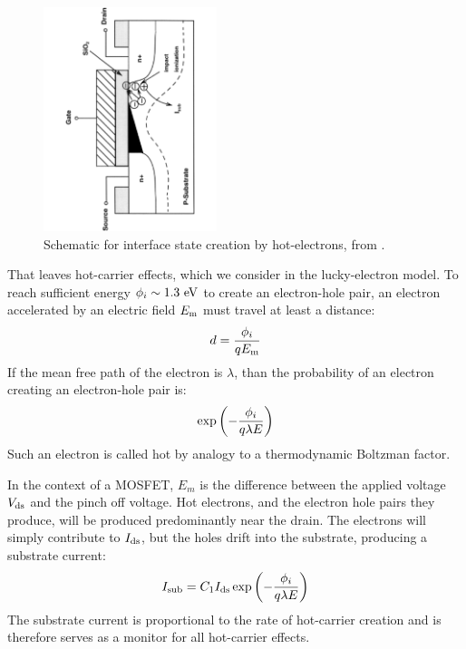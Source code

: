 \documentclass[12pt]{article}
\begin{document}
\begin{figure}[htbp]
\begin{center}
\includegraphics[width=0.45\textwidth,angle=270]{figs/hot-carrier.pdf} 
\caption{Schematic for interface state creation by hot-electrons, from \cite{hot-carrier-effects}.}
\label{fig:lifetime}
\end{center}
\end{figure}

That leaves hot-carrier effects, which we consider in the lucky-electron model.   To reach sufficient energy $\phi_i \sim 1.3~\rm eV$ to create an electron-hole pair, an electron accelerated by an electric field $E_{\rm m}$ must travel at least a distance:
\begin{displaymath}
d = \frac{\phi_i}{q E_{\rm m}}
\end{displaymath}
If the mean free path of the electron is $\lambda$, than the probability of an electron creating an electron-hole pair is:
\begin{displaymath}
\exp\left(-\frac{\phi_i}{q \lambda E_{\rm}}\right)
\end{displaymath}
Such an electron is called hot by analogy to a thermodynamic Boltzman factor.

In the context of a MOSFET, $E_m$ is the difference between the applied voltage $V_{\rm ds}$ and the pinch off voltage.  Hot electrons, and the electron hole pairs they produce, will be produced predominantly near the drain.  The electrons will simply contribute to $I_{\rm ds}$, but the holes drift into the substrate, producing a substrate current:
\begin{equation}\label{eqn:isub}
I_{\rm sub} = C_1 I_{\rm ds} \exp\left(-\frac{\phi_i}{q \lambda E_{\rm}}\right)
\end{equation}
The substrate current is proportional to the rate of hot-carrier creation and is therefore serves as a monitor for all hot-carrier effects.
\end{document}

